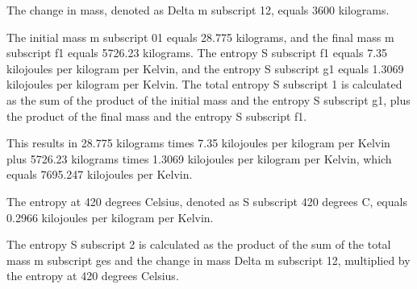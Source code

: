 The change in mass, denoted as Delta m subscript 12, equals 3600 kilograms.

The initial mass m subscript 01 equals 28.775 kilograms, and the final mass m subscript f1 equals 5726.23 kilograms. The entropy S subscript f1 equals 7.35 kilojoules per kilogram per Kelvin, and the entropy S subscript g1 equals 1.3069 kilojoules per kilogram per Kelvin. The total entropy S subscript 1 is calculated as the sum of the product of the initial mass and the entropy S subscript g1, plus the product of the final mass and the entropy S subscript f1.

This results in 28.775 kilograms times 7.35 kilojoules per kilogram per Kelvin plus 5726.23 kilograms times 1.3069 kilojoules per kilogram per Kelvin, which equals 7695.247 kilojoules per Kelvin.

The entropy at 420 degrees Celsius, denoted as S subscript 420 degrees C, equals 0.2966 kilojoules per kilogram per Kelvin.

The entropy S subscript 2 is calculated as the product of the sum of the total mass m subscript ges and the change in mass Delta m subscript 12, multiplied by the entropy at 420 degrees Celsius.